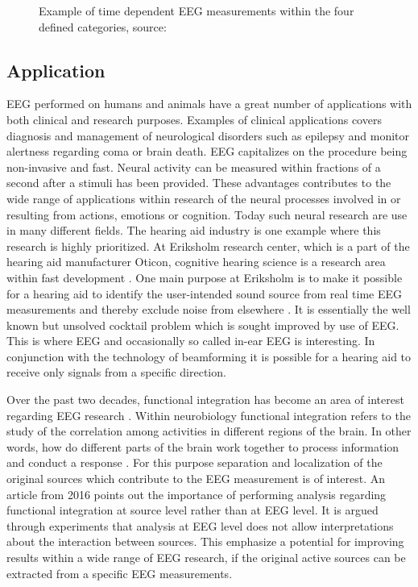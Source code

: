 \begin{figure}[H]
\begin{minipage}[t]{.45\textwidth}
        \caption{Example of time dependent EEG measurements within the four defined categories, source: \cite{EEGsignalprocessing}}\label{fig:EEG_example}
    \end{minipage}
\end{figure}

\subsection{Application}
EEG performed on humans and animals have a great number of applications with both clinical and research purposes. 
Examples of clinical applications covers diagnosis and management of neurological disorders such as epilepsy and monitor alertness regarding coma or brain death.
EEG capitalizes on the procedure being non-invasive and fast.
Neural activity can be measured within fractions of a second after a stimuli has been provided. 
These advantages contributes to the wide range of applications within research of the neural processes involved in or resulting from actions, emotions or  cognition. Today such neural research are use in many different fields\cite[p. 4]{fundamentalEEG}.
The hearing aid industry is one example where this research is highly prioritized. 
At Eriksholm research center, which is a part of the hearing aid manufacturer Oticon, cognitive hearing science is a research area within fast development \cite{Weberik}. 
One main purpose at Eriksholm is to make it possible for a hearing aid to identify the user-intended sound source from real time EEG measurements and thereby exclude noise from elsewhere \cite{Emina2019} \cite{Bech2018}. 
It is essentially the well known but unsolved cocktail problem which is sought improved by use of EEG. 
This is where EEG and occasionally so called in-ear EEG is interesting. In conjunction with the technology of beamforming it is possible for a hearing aid to receive only signals from a specific direction. 

Over the past two decades, functional integration has become an area of interest regarding EEG research \cite{Friston2011}. 
Within neurobiology functional integration refers to the study of the correlation among activities in different regions of the brain. 
In other words, how do different parts of the brain work together to process information and conduct a response \cite{Friston2002}.     
For this purpose separation and localization of the original sources which contribute to the EEG measurement is of interest. 
An article from 2016 \cite{Van2019} points out the importance of performing analysis regarding functional integration at source level rather than at EEG level. 
It is argued through experiments that analysis at EEG level does not allow interpretations about the interaction between sources. 
This emphasize a potential for improving results within a wide range of EEG research, if the original active sources can be extracted from a specific EEG measurements.    

